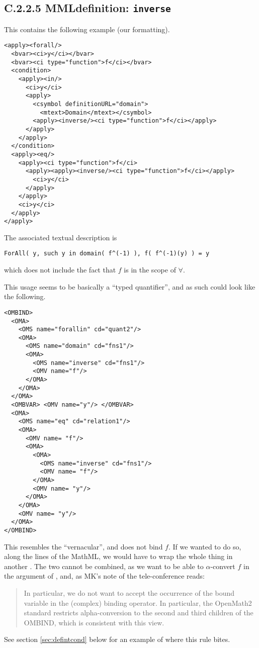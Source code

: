 \documentclass{llncs}
\begin{document}
{\subsection{C.2.2.5 MMLdefinition: {\tt inverse}}\label{C225}
This contains the following example (our formatting).
\begin{lstlisting}[language=MathML2]
<apply><forall/>
  <bvar><ci>y</ci></bvar>
  <bvar><ci type="function">f</ci></bvar>
  <condition>
    <apply><in/>
      <ci>y</ci>
      <apply>
        <csymbol definitionURL="domain">
          <mtext>Domain</mtext></csymbol>
        <apply><inverse/><ci type="function">f</ci></apply>
      </apply>
    </apply>
  </condition>
  <apply><eq/>
    <apply><ci type="function">f</ci>
      <apply><apply><inverse/><ci type="function">f</ci></apply>
        <ci>y</ci>
      </apply>
    </apply>
    <ci>y</ci>
  </apply>
</apply>
\end{lstlisting}
The associated textual description is 
\begin{lstlisting}
ForAll( y, such y in domain( f^(-1) ), f( f^(-1)(y) ) = y
\end{lstlisting}
which does not include the fact that $f$ is in the scope of $\forall$.
\par
This usage seems to be basically a ``typed quantifier'', and as such could
look like the following.
\begin{lstlisting}
<OMBIND>
  <OMA>
    <OMS name="forallin" cd="quant2"/>
    <OMA>
      <OMS name="domain" cd="fns1"/>
      <OMA>
        <OMS name="inverse" cd="fns1"/>
        <OMV name="f"/>
      </OMA>
    </OMA>
  </OMA>
  <OMBVAR> <OMV name="y"/> </OMBVAR>
  <OMA>
    <OMS name="eq" cd="relation1"/>
    <OMA>
      <OMV name= "f"/>
      <OMA>
        <OMA>
          <OMS name="inverse" cd="fns1"/>
          <OMV name= "f"/>
        </OMA>
        <OMV name= "y"/>
      </OMA>
    </OMA>
    <OMV name= "y"/>
  </OMA>
</OMBIND>
\end{lstlisting}
This resembles the ``vernacular'', and does not bind $f$. If we wanted to do
so, along the lines of the MathML, we would have to wrap the whole thing in
another {}. The two cannot be combined, as we want to be able to
$\alpha$-convert $f$ in the argument of {}, and, as MK's
note of the tele-conference reads:
\begin{quotation}\noindent
In particular, we do not
      want to accept the occurrence of the bound variable in the
      (complex) binding operator. In particular, the OpenMath2 standard
      restricts alpha-conversion to the second and third children of the
      OMBIND, which is consistent with this view.
\end{quotation} 
See section \ref{sec:defintcond} below for an example of where this rule
bites.
}
\end{document}

